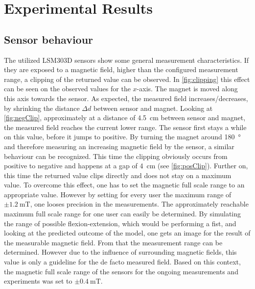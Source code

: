 \lhead[\chaptername~\thechapter]{\rightmark}

\rhead[\leftmark]{}

\lfoot[\thepage]{}

\cfoot{}

\rfoot[]{\thepage}

\chapter{Experimental Results} \label{cha:results}

\section{Sensor behaviour} \label{sec:dataRes}

The utilized LSM303D sensors show some general measurement characteristics. If they are exposed to a magnetic field, higher than the configured measurement range, a clipping of the returned value can be observed. In \ref{fig:clipping} this effect can be seen on the observed values for the $ x $-axis. The magnet is moved along this axis towards the sensor. As expected, the measured field increases/decreases, by shrinking the distance $ \Delta d $ between sensor and magnet. Looking at \ref{fig:negClip}, approximately at a distance of \SI{4.5}{\cm} between sensor and magnet, the measured field reaches the current lower range. The sensor first stays a while on this value, before it jumps to positive. By turning the magnet around \SI{180}{\degree} and therefore measuring an increasing magnetic field by the sensor, a similar behaviour can be recognized. This time the clipping obviously occurs from positive to negative and happens at a gap of \SI{4}{\cm} (see \ref{fig:posClip}). Further on, this time the returned value clips directly and does not stay on a maximum value. To overcome this effect, one has to set the magnetic full scale range to an appropriate value. However by setting for every user the maximum range of $ \pm \SI{1.2}{\milli \tesla} $, one looses precision in the measurements. The approximately reachable maximum full scale range for one user can easily be determined. By simulating the range of possible flexion-extension, which would be performing a fist, and looking at the predicted outcome of the  model, one gets an image for the result of the measurable magnetic field. From that the measurement range can be determined. However due to the influence of surrounding magnetic fields, this value is only a guideline for the de facto measured field. Based on this context, the magnetic full scale range of the sensors for the ongoing measurements and experiments was set to $ \pm \SI{0.4}{\milli \tesla} $.

